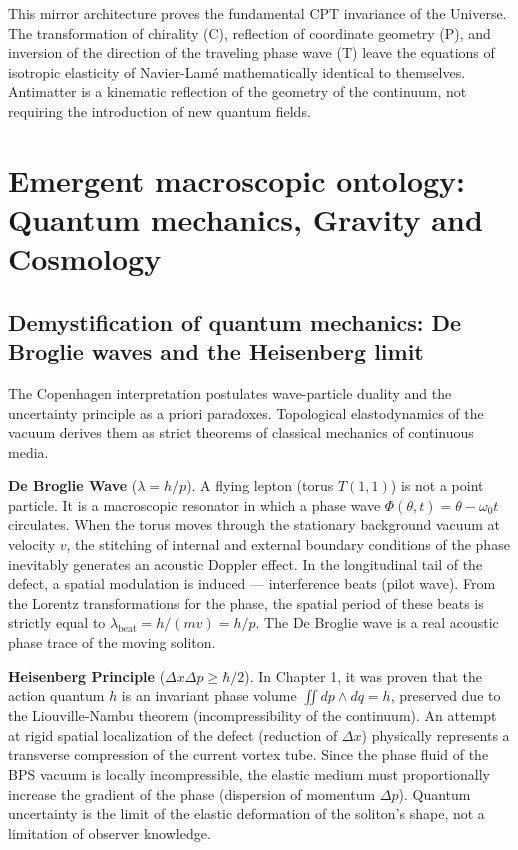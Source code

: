 \documentclass[11pt,a4paper]{article}
\begin{document}
This mirror architecture proves the fundamental CPT invariance of the Universe. The transformation of chirality (C), reflection of coordinate geometry (P), and inversion of the direction of the traveling phase wave (T) leave the equations of isotropic elasticity of Navier-Lamé mathematically identical to themselves. Antimatter is a kinematic reflection of the geometry of the continuum, not requiring the introduction of new quantum fields.

\section{Emergent macroscopic ontology: Quantum mechanics, Gravity and Cosmology}

\subsection{Demystification of quantum mechanics: De Broglie waves and the Heisenberg limit}
The Copenhagen interpretation postulates wave-particle duality and the uncertainty principle as a priori paradoxes. Topological elastodynamics of the vacuum derives them as strict theorems of classical mechanics of continuous media.

\textbf{De Broglie Wave} ($\lambda = h/p$). A flying lepton (torus $T(1,1)$) is not a point particle. It is a macroscopic resonator in which a phase wave $\Phi(\theta, t) = \theta - \omega_0 t$ circulates. When the torus moves through the stationary background vacuum at velocity $v$, the stitching of internal and external boundary conditions of the phase inevitably generates an acoustic Doppler effect. In the longitudinal tail of the defect, a spatial modulation is induced — interference beats (pilot wave). From the Lorentz transformations for the phase, the spatial period of these beats is strictly equal to $\lambda_{\text{beat}} = h / (mv) = h/p$. The De Broglie wave is a real acoustic phase trace of the moving soliton.

\textbf{Heisenberg Principle} ($\Delta x \Delta p \ge \hbar/2$). In Chapter 1, it was proven that the action quantum $h$ is an invariant phase volume $\iint dp \wedge dq = h$, preserved due to the Liouville-Nambu theorem (incompressibility of the continuum). An attempt at rigid spatial localization of the defect (reduction of $\Delta x$) physically represents a transverse compression of the current vortex tube. Since the phase fluid of the BPS vacuum is locally incompressible, the elastic medium must proportionally increase the gradient of the phase (dispersion of momentum $\Delta p$). Quantum uncertainty is the limit of the elastic deformation of the soliton's shape, not a limitation of observer knowledge.
\end{document}
